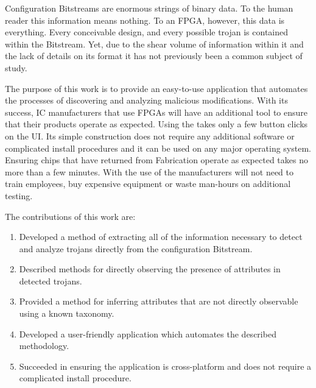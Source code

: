 \label{concl}
Configuration \gls{Bitstream}s are enormous strings of binary data.
To the human reader this information means nothing.
To an \acrshort{FPGA}, however, this data is everything.
Every conceivable design, and every possible trojan is contained within the \gls{Bitstream}.
Yet, due to the shear volume of information within it and the lack of details on its format it has not previously been a common subject of study.

The purpose of this work is to provide an easy-to-use application that automates the processes of discovering and analyzing malicious modifications.
With its success, \acrlong{IC} manufacturers that use \acrshort{FPGA}s will have an additional tool to ensure that their products operate as expected.
Using the \NameNoPeriod takes only a few button clicks on the \acrlong{UI}.
Its simple construction does not require any additional software or complicated install procedures and it can be used on any major operating system.
Ensuring chips that have returned from Fabrication operate as expected takes no more than a few minutes.
With the use of the \NameNoPeriod manufacturers will not need to train employees, buy expensive equipment or waste man-hours on additional testing.

The contributions of this work are:
\begin{enumerate}
	\item Developed a method of extracting all of the information necessary to detect and analyze trojans directly from the configuration \gls{Bitstream}. 
	\item Described methods for directly observing the presence of attributes in detected trojans.
	\item Provided a method for inferring attributes that are not directly observable using a known taxonomy.
	\item Developed a user-friendly application which automates the described methodology.
	\item Succeeded in ensuring the application is cross-platform and does not require a complicated install procedure.
\end{enumerate}




